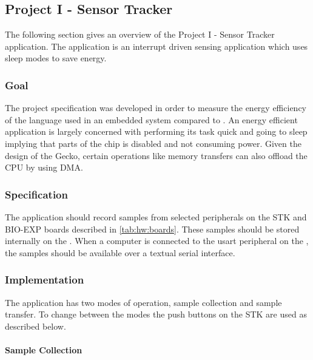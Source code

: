 \subsection{Project I - Sensor Tracker}
\label{sec:impl:project:i}

The following section gives an overview of the Project I - Sensor Tracker application.
The application is an interrupt driven sensing application which uses sleep modes to save energy.

\subsubsection{Goal}
The project specification was developed in order to measure the energy efficiency of the {\rust} language used in an embedded system compared to {\C}.
An energy efficient application is largely concerned with performing its task quick and going to sleep implying that parts of the chip is disabled and not consuming power.
Given the design of the Gecko, certain operations like memory transfers can also offload the CPU by using DMA.


\subsubsection{Specification}

The application should record samples from selected peripherals on the STK and BIO-EXP boards described in \autoref{tab:hw:boards}.
These samples should be stored internally on the {\gecko}.
When a computer is connected to the \gls{usart} peripheral on the {\gecko}, the samples should be available over a textual serial interface.

\subsubsection{Implementation}

The application has two modes of operation, sample collection and sample transfer.
To change between the modes the push buttons on the STK are used as described below.

\paragraph{Sample Collection}
\label{sec:project:i:sample-collection}

